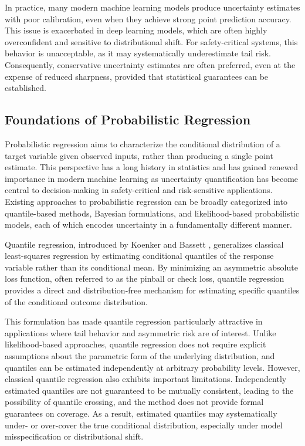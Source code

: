 In practice, many modern machine learning models produce uncertainty estimates with poor calibration, even when they achieve strong point prediction accuracy. This issue is exacerbated in deep learning models, which are often highly overconfident and sensitive to distributional shift. For safety-critical systems, this behavior is unacceptable, as it may systematically underestimate tail risk. Consequently, conservative uncertainty estimates are often preferred, even at the expense of reduced sharpness, provided that statistical guarantees can be established.

\subsection{Foundations of Probabilistic Regression}

Probabilistic regression aims to characterize the conditional distribution of a target variable given observed inputs, rather than producing a single point estimate. This perspective has a long history in statistics and has gained renewed importance in modern machine learning as uncertainty quantification has become central to decision-making in safety-critical and risk-sensitive applications. Existing approaches to probabilistic regression can be broadly categorized into quantile-based methods, Bayesian formulations, and likelihood-based probabilistic models, each of which encodes uncertainty in a fundamentally different manner.

Quantile regression, introduced by Koenker and Bassett \cite{koenker1978regression}, generalizes classical least-squares regression by estimating conditional quantiles of the response variable rather than its conditional mean. By minimizing an asymmetric absolute loss function, often referred to as the pinball or check loss, quantile regression provides a direct and distribution-free mechanism for estimating specific quantiles of the conditional outcome distribution.

This formulation has made quantile regression particularly attractive in applications where tail behavior and asymmetric risk are of interest. Unlike likelihood-based approaches, quantile regression does not require explicit assumptions about the parametric form of the underlying distribution, and quantiles can be estimated independently at arbitrary probability levels. However, classical quantile regression also exhibits important limitations. Independently estimated quantiles are not guaranteed to be mutually consistent, leading to the possibility of quantile crossing, and the method does not provide formal guarantees on coverage. As a result, estimated quantiles may systematically under- or over-cover the true conditional distribution, especially under model misspecification or distributional shift.

